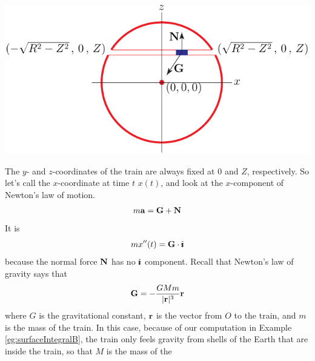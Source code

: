 \begin{eg}
\begin{nfig}
\begin{center}
    \includegraphics{gravityTrainB.pdf}
\end{center}
\end{nfig}
The $y$- and $z$-coordinates of the train are always fixed at $0$ and 
$Z$, respectively. So let's call the $x$-coordinate at time $t$
$x(t)$, and look at the $x$-component of Newton's law of motion.
\begin{align*}
m\mathbf{a} = \mathbf{G} +\mathbf{N}
\end{align*} 
It is
\begin{equation*}
m x''(t) = \mathbf{G}\cdot\hat{\pmb{\imath}}
\end{equation*}
because the normal force $\mathbf{N}$ has no $\hat{\pmb{\imath}}$ component. Recall that 
Newton's law of gravity says that
\begin{equation*}
\mathbf{G} = -\frac{GMm}{|\mathbf{r}|^3}\mathbf{r}
\end{equation*}
where $G$ is the gravitational constant, $\mathbf{r}$ is the vector from $O$ to the train, and $m$ is the mass of the train. In this case, because of our 
computation in Example \ref{eg:surfaceIntegralB}, the train only feels 
gravity from shells of the Earth that are inside the train, so that
$M$ is the mass of the 
\end{eg}
